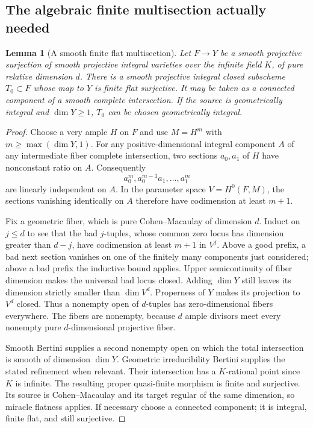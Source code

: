 \documentclass[11pt,a4paper]{article}
\newtheorem{lemma}[theorem]{Lemma}
\theoremstyle{definition}
\theoremstyle{remark}
\begin{document}
\subsection{The algebraic finite multisection actually needed}

\begin{lemma}[A smooth finite flat multisection]
\label{r11p:multisection}
Let $F\to Y$ be a smooth projective surjection of smooth projective
integral varieties over the infinite field $K$, of pure relative
dimension $d$.  There is a smooth projective integral closed subscheme
$T_0\subset F$ whose map to $Y$ is finite flat surjective.
It may be taken as a connected component of a smooth complete intersection.
If the source is geometrically integral and $\dim Y\geq1$, $T_0$
can be chosen geometrically integral.
\end{lemma}

\begin{proof}
Choose a very ample $H$ on $F$ and use $M=H^m$ with
$m\geq\max(\dim Y,1)$.  For any positive-dimensional integral component
$A$ of any intermediate fiber complete intersection, two sections
$a_0,a_1$ of $H$ have nonconstant ratio on $A$.  Consequently
\[
                    a_0^m,a_0^{m-1}a_1,\ldots,a_1^m
\]
are linearly independent on $A$.  In the parameter space
$V=H^0(F,M)$, the sections vanishing identically on $A$ therefore
have codimension at least $m+1$.

Fix a geometric fiber, which is pure Cohen--Macaulay of dimension $d$.
Induct on $j\leq d$ to see that the bad $j$-tuples, whose common
zero locus has dimension greater than $d-j$, have codimension at least
$m+1$ in $V^j$.  Above a good prefix, a bad next section vanishes
on one of the finitely many components just considered; above a bad
prefix the inductive bound applies.  Upper semicontinuity of fiber
dimension makes the universal bad locus closed.  Adding $\dim Y$
still leaves its dimension strictly smaller than $\dim V^d$.
Properness of $Y$ makes its projection to $V^d$ closed.  Thus a
nonempty open of $d$-tuples has zero-dimensional fibers everywhere.
The fibers are nonempty, because $d$ ample divisors meet every
nonempty pure $d$-dimensional projective fiber.

Smooth Bertini supplies a second nonempty open on which the total
intersection is smooth of dimension $\dim Y$.  Geometric irreducibility
Bertini supplies the stated refinement when relevant.  Their intersection
has a $K$-rational point since $K$ is infinite.  The resulting proper
quasi-finite morphism is finite and surjective.  Its source is
Cohen--Macaulay and its target regular of the same dimension, so
miracle flatness applies.  If necessary choose a connected component;
it is integral, finite flat, and still surjective.
\end{proof}
\end{document}
